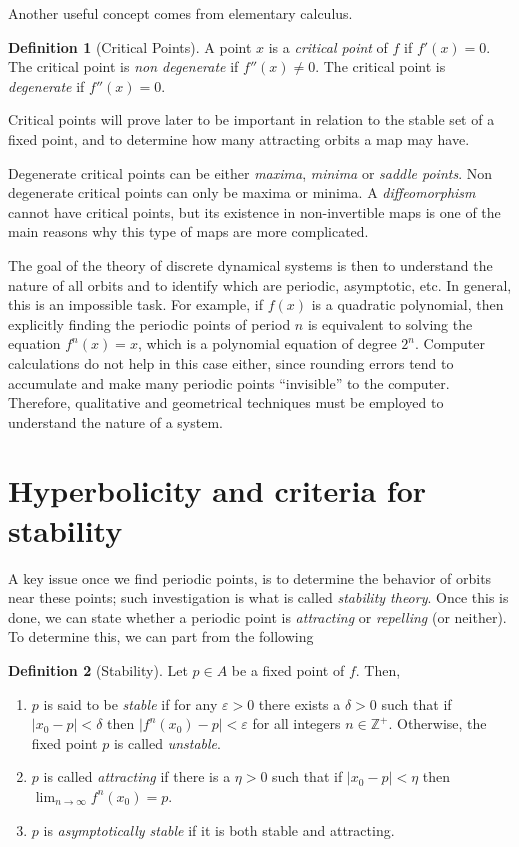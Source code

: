 \documentclass[10pt,twoside,titlepage]{book}
\numberwithin{equation}{chapter}
\numberwithin{figure}{chapter}
\numberwithin{table}{chapter}
\theoremstyle{plain}%
\theoremstyle{definition}
\newtheorem{defn}{Definition}[chapter]
\theoremstyle{remark}
\begin{document}
Another useful concept comes from elementary calculus.

\begin{defn}[Critical Points]
	A point $x$ is a \emph{critical point} of $f$ if $f'(x)=0$. The critical point is \emph{non degenerate} if $f''(x)\neq0$. The critical point is \emph{degenerate} if $f''(x)=0$.
\end{defn}

Critical points will prove later to be important in relation to the stable set of a fixed point, and to determine how many attracting orbits a map may have.

Degenerate critical points can be either \emph{maxima}, \emph{minima} or \emph{saddle points}. Non degenerate critical points can only be maxima or minima. A \emph{diffeomorphism} cannot have critical points, but its existence in non-invertible maps is one of the main reasons why this type of maps are more complicated.

The goal of the theory of discrete dynamical systems is then to understand the nature of all orbits and to identify which are periodic, asymptotic, etc. In general, this is an impossible task. For example, if $f(x)$ is a quadratic polynomial, then explicitly finding the periodic points of period $n$ is equivalent to solving the equation $f^{n}(x)=x$, which is a polynomial equation of degree $2^{n}$. Computer calculations do not help in this case either, since rounding errors tend to accumulate and make many periodic points ``invisible'' to the computer. Therefore, qualitative and geometrical techniques must be employed to understand the nature of a system.

\section{Hyperbolicity and criteria for stability}

A key issue once we find periodic points, is to determine the behavior of orbits near these points; such investigation is what is called \emph{stability theory}. Once this is done, we can state whether a periodic point is \emph{attracting} or \emph{repelling} (or neither). To determine this, we can part from the following

\begin{defn}[Stability]
	Let $p\in A$ be a fixed point of $f$. Then,
	\begin{enumerate}
		\item $p$ is said to be \emph{stable} if for any $\varepsilon>0$ there exists a $\delta>0$ such that if $\vert x_0-p\vert<\delta$ then $\vert f^n(x_0)-p\vert<\varepsilon$ for all integers $n\in\mathbb{Z}^+$. Otherwise, the fixed point $p$ is called \emph{unstable}.
		\item $p$ is called \emph{attracting} if there is a $\eta>0$ such that if $\vert x_0-p\vert<\eta$ then $\lim_{n\rightarrow\infty}f^n(x_0)=p$.
		\item $p$ is \emph{asymptotically stable} if it is both stable and attracting.
	\end{enumerate}
\end{defn}
\end{document}

